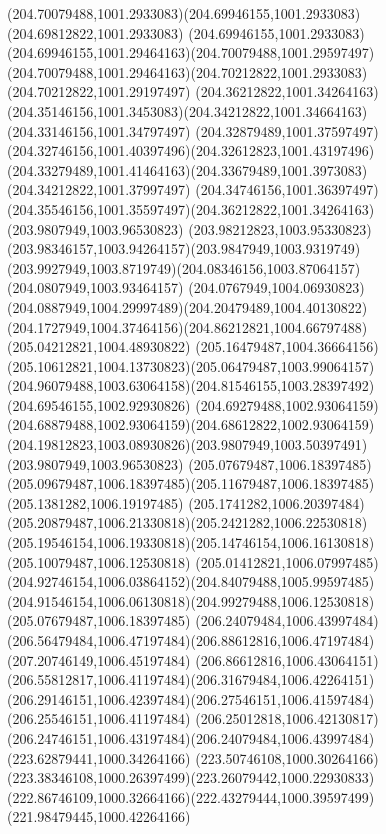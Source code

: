 {{	\curveto(204.70079488,1001.2933083)(204.69946155,1001.2933083)(204.69812822,1001.2933083)
	\curveto(204.69946155,1001.2933083)(204.69946155,1001.29464163)(204.70079488,1001.29597497)
	\curveto(204.70079488,1001.29464163)(204.70212822,1001.2933083)(204.70212822,1001.29197497)
	\moveto(204.36212822,1001.34264163)
	\curveto(204.35146156,1001.3453083)(204.34212822,1001.34664163)(204.33146156,1001.34797497)
	\curveto(204.32879489,1001.37597497)(204.32746156,1001.40397496)(204.32612823,1001.43197496)
	\curveto(204.33279489,1001.41464163)(204.33679489,1001.3973083)(204.34212822,1001.37997497)
	\curveto(204.34746156,1001.36397497)(204.35546156,1001.35597497)(204.36212822,1001.34264163)
	\moveto(203.9807949,1003.96530823)
	\curveto(203.98212823,1003.95330823)(203.98346157,1003.94264157)(203.9847949,1003.9319749)
	\curveto(203.9927949,1003.8719749)(204.08346156,1003.87064157)(204.0807949,1003.93464157)
	\curveto(204.0767949,1004.06930823)(204.0887949,1004.29997489)(204.20479489,1004.40130822)
	\curveto(204.1727949,1004.37464156)(204.86212821,1004.66797488)(205.04212821,1004.48930822)
	\curveto(205.16479487,1004.36664156)(205.10612821,1004.13730823)(205.06479487,1003.99064157)
	\curveto(204.96079488,1003.63064158)(204.81546155,1003.28397492)(204.69546155,1002.92930826)
	\curveto(204.69279488,1002.93064159)(204.68879488,1002.93064159)(204.68612822,1002.93064159)
	\curveto(204.19812823,1003.08930826)(203.9807949,1003.50397491)(203.9807949,1003.96530823)
	\moveto(205.07679487,1006.18397485)
	\curveto(205.09679487,1006.18397485)(205.11679487,1006.18397485)(205.1381282,1006.19197485)
	\curveto(205.1741282,1006.20397484)(205.20879487,1006.21330818)(205.2421282,1006.22530818)
	\curveto(205.19546154,1006.19330818)(205.14746154,1006.16130818)(205.10079487,1006.12530818)
	\curveto(205.01412821,1006.07997485)(204.92746154,1006.03864152)(204.84079488,1005.99597485)
	\curveto(204.91546154,1006.06130818)(204.99279488,1006.12530818)(205.07679487,1006.18397485)
	\moveto(206.24079484,1006.43997484)
	\curveto(206.56479484,1006.47197484)(206.88612816,1006.47197484)(207.20746149,1006.45197484)
	\curveto(206.86612816,1006.43064151)(206.55812817,1006.41197484)(206.31679484,1006.42264151)
	\curveto(206.29146151,1006.42397484)(206.27546151,1006.41597484)(206.25546151,1006.41197484)
	\curveto(206.25012818,1006.42130817)(206.24746151,1006.43197484)(206.24079484,1006.43997484)
	\moveto(223.62879441,1000.34264166)
	\curveto(223.50746108,1000.30264166)(223.38346108,1000.26397499)(223.26079442,1000.22930833)
	\curveto(222.86746109,1000.32664166)(222.43279444,1000.39597499)(221.98479445,1000.42264166)
}}
